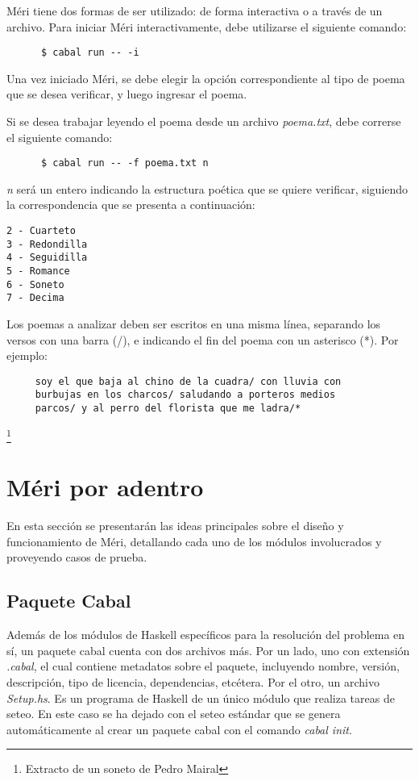 \documentclass[12pt, a4paper]{article}
\begin{document}
Méri tiene dos formas de ser utilizado: de forma interactiva o a través de un archivo. Para iniciar Méri interactivamente, debe utilizarse el siguiente comando:
\begin{verbatim}
      $ cabal run -- -i
\end{verbatim}
Una vez iniciado Méri, se debe elegir la opción correspondiente al tipo de poema que se desea verificar, y luego ingresar el poema. 

\medskip

Si se desea trabajar leyendo el poema desde un archivo \textit{poema.txt}, debe correrse el siguiente comando:
\begin{verbatim}
      $ cabal run -- -f poema.txt n
\end{verbatim}
\textit{n} será un entero indicando la estructura poética que se quiere verificar, siguiendo la correspondencia que se presenta a continuación: 
\begin{verbatim}
2 - Cuarteto
3 - Redondilla
4 - Seguidilla
5 - Romance
6 - Soneto
7 - Decima
\end{verbatim}
Los poemas a analizar deben ser escritos en una misma línea, separando los versos con una barra (/), e indicando el fin del poema con un asterisco (*). Por ejemplo:
\begin{verbatim}
     soy el que baja al chino de la cuadra/ con lluvia con 
     burbujas en los charcos/ saludando a porteros medios 
     parcos/ y al perro del florista que me ladra/*
\end{verbatim}\footnote{Extracto de un soneto de Pedro Mairal}
\section*{Méri por adentro}
En esta sección se presentarán las ideas principales sobre el diseño y funcionamiento de Méri, detallando cada uno de los módulos involucrados y proveyendo casos de prueba.

\subsection*{Paquete Cabal}
Además de los módulos de Haskell específicos para la resolución del problema en sí, un paquete cabal cuenta con dos archivos más. Por un lado, uno con extensión \textit{.cabal}, el cual contiene metadatos sobre el paquete, incluyendo nombre, versión, descripción, tipo de licencia, dependencias, etcétera. Por el otro, un archivo \textit{Setup.hs}. Es un programa de Haskell de un único módulo que realiza tareas de seteo. En este caso se ha dejado con el seteo estándar que se genera automáticamente al crear un paquete cabal con el comando \textit{cabal init}.  
\end{document}
